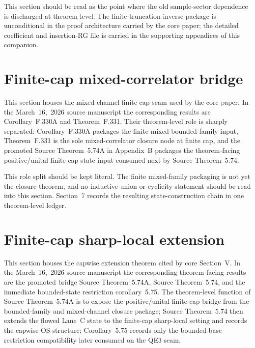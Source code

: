 \documentclass[preprint,aip,jmp,amsmath,amssymb,nofootinbib]{revtex4-2}
\begin{document}

This section should be read as the point where the old sample-sector dependence is discharged at theorem level. The finite-truncation inverse package is unconditional in the proof architecture carried by the core paper; the detailed coefficient and insertion-RG file is carried in the supporting appendices of this companion.

\section{Finite-cap mixed-correlator bridge}
This section houses the mixed-channel finite-cap seam used by the core paper. In the March~16,~2026 source manuscript the corresponding results are Corollary~F.330A and Theorem~F.331. Their theorem-level role is sharply separated: Corollary~F.330A packages the finite mixed bounded-family input, Theorem~F.331 is the sole mixed-correlator closure node at finite cap, and the promoted Source Theorem~5.74A in Appendix~B packages the theorem-facing positive/unital finite-cap state input consumed next by Source Theorem~5.74.


This role split should be kept literal. The finite mixed-family packaging is not yet the closure theorem, and no inductive-union or cyclicity statement should be read into this section. Section~7 records the resulting state-construction chain in one theorem-level ledger.

\section{Finite-cap sharp-local extension}
This section houses the capwise extension theorem cited by core Section~V. In the March~16,~2026 source manuscript the corresponding theorem-facing results are the promoted bridge Source Theorem~5.74A, Source Theorem~5.74, and the immediate bounded-state restriction corollary~5.75. The theorem-level function of Source Theorem~5.74A is to expose the positive/unital finite-cap bridge from the bounded-family and mixed-channel closure package; Source Theorem~5.74 then extends the flowed Lane~C state to the finite-cap sharp-local setting and records the capwise OS structure; Corollary~5.75 records only the bounded-base restriction compatibility later consumed on the QE3 seam.
\end{document}
